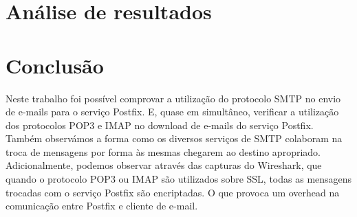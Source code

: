 \documentclass[a4paper,12pt]{article}
\begin{document}
\section{Análise de resultados}


\section{Conclusão}

Neste trabalho foi possível comprovar a utilização do protocolo SMTP no 
envio de e-mails para o serviço Postfix. E, quase em simultâneo, verificar 
a utilização dos protocolos POP3 e IMAP no download de e-mails do 
serviço Postfix.
Também observámos a forma como os diversos serviços de SMTP colaboram na
troca de mensagens por forma às mesmas chegarem ao destino apropriado.
Adicionalmente, podemos observar através das capturas do Wireshark, que
quando o protocolo POP3 ou IMAP são utilizados sobre SSL, todas as
mensagens trocadas com o serviço Postfix são encriptadas. O que provoca
um overhead na comunicação entre Postfix e cliente de e-mail.
\end{document}

